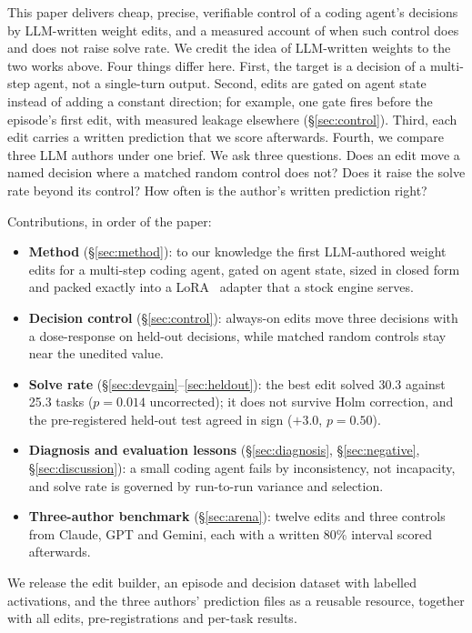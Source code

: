 This paper delivers cheap, precise, verifiable control of a coding agent's decisions by LLM-written weight edits, and a measured account of when such control does and does not raise solve rate. We credit the idea of LLM-written weights to the two works above. Four things differ here. First, the target is a decision of a multi-step agent, not a single-turn output. Second, edits are gated on agent state instead of adding a constant direction; for example, one gate fires before the episode's first edit, with measured leakage elsewhere (\S\ref{sec:control}). Third, each edit carries a written prediction that we score afterwards. Fourth, we compare three LLM authors under one brief. We ask three questions. Does an edit move a named decision where a matched random control does not? Does it raise the solve rate beyond its control? How often is the author's written prediction right?

\noindent Contributions, in order of the paper:
\begin{itemize}
    \item \textbf{Method} (\S\ref{sec:method}): to our knowledge the first LLM-authored weight edits for a multi-step coding agent, gated on agent state, sized in closed form and packed exactly into a LoRA~\citep{Hu2021LoraLowrank} adapter that a stock engine serves.
    \item \textbf{Decision control} (\S\ref{sec:control}): always-on edits move three decisions with a dose-response on held-out decisions, while matched random controls stay near the unedited value.
    \item \textbf{Solve rate} (\S\ref{sec:devgain}--\ref{sec:heldout}): the best edit solved 30.3 against 25.3 tasks ($p = 0.014$ uncorrected); it does not survive Holm correction, and the pre-registered held-out test agreed in sign ($+3.0$, $p = 0.50$).
    \item \textbf{Diagnosis and evaluation lessons} (\S\ref{sec:diagnosis}, \S\ref{sec:negative}, \S\ref{sec:discussion}): a small coding agent fails by inconsistency, not incapacity, and solve rate is governed by run-to-run variance and selection.
    \item \textbf{Three-author benchmark} (\S\ref{sec:arena}): twelve edits and three controls from Claude, GPT and Gemini, each with a written 80\% interval scored afterwards.
\end{itemize}
We release the edit builder, an episode and decision dataset with labelled activations, and the three authors' prediction files as a reusable resource, together with all edits, pre-registrations and per-task results.


